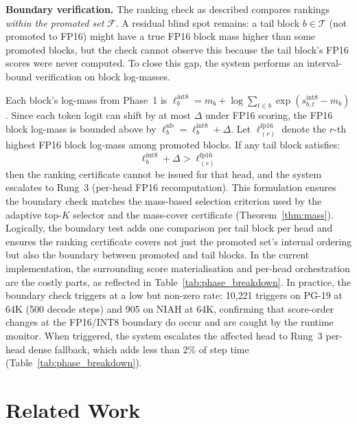 \documentclass[11pt,a4paper]{article}
\theoremstyle{definition}
\theoremstyle{remark}
\begin{document}
\textbf{Boundary verification.}  The ranking check as described compares rankings \emph{within the promoted set} $\mathcal{F}$.  A residual blind spot remains: a tail block $b \in \mathcal{T}$ (not promoted to FP16) might have a true FP16 block mass higher than some promoted blocks, but the check cannot observe this because the tail block's FP16 scores were never computed.  To close this gap, the system performs an interval-bound verification on block log-masses.

Each block's log-mass from Phase~1 is $\ell_b^{\mathrm{int8}} = m_b + \log \sum_{t \in b} \exp(s^{\mathrm{int8}}_{b,t} - m_b)$.  Since each token logit can shift by at most $\Delta$ under FP16 scoring, the FP16 block log-mass is bounded above by $\ell_b^{\mathrm{ub}} = \ell_b^{\mathrm{int8}} + \Delta$.  Let $\ell^{\mathrm{fp16}}_{(r)}$ denote the $r$-th highest FP16 block log-mass among promoted blocks.  If any tail block satisfies:
\begin{equation}
  \ell_b^{\mathrm{int8}} + \Delta > \ell^{\mathrm{fp16}}_{(r)}
  \label{eq:boundary_check}
\end{equation}
then the ranking certificate cannot be issued for that head, and the system escalates to Rung~3 (per-head FP16 recomputation).  This formulation ensures the boundary check matches the mass-based selection criterion used by the adaptive top-$K$ selector and the mass-cover certificate (Theorem~\ref{thm:mass}).  Logically, the boundary test adds one comparison per tail block per head and ensures the ranking certificate covers not just the promoted set's internal ordering but also the boundary between promoted and tail blocks.  In the current implementation, the surrounding score materialisation and per-head orchestration are the costly parts, as reflected in Table~\ref{tab:phase_breakdown}.  In practice, the boundary check triggers at a low but non-zero rate: 10{,}221 triggers on PG-19 at 64K (500 decode steps) and 905 on NIAH at 64K, confirming that score-order changes at the FP16/INT8 boundary do occur and are caught by the runtime monitor.  When triggered, the system escalates the affected head to Rung~3 per-head dense fallback, which adds less than 2\% of step time (Table~\ref{tab:phase_breakdown}).


\section{Related Work}
\label{sec:related}
\end{document}
